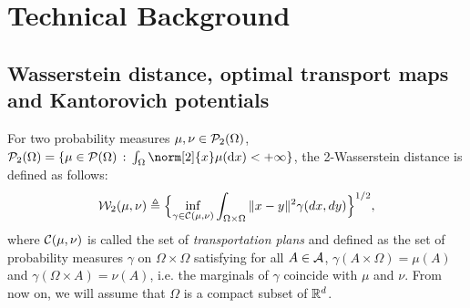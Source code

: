
\section{Technical Background}
\label{sec:techbg}




\vspace{-2pt}

\subsection{Wasserstein distance, optimal transport maps and Kantorovich potentials }
%
For two probability measures $\mu,\nu \in {\cal P}_2(\Omega)$, $\PS_2(\Omega) = \{ \mu \in \PS(\Omega) \, :\, \int_{\Omega} \norm[2]{x} \mu(\rmd x) < \plusinfty\}$, the 2-Wasserstein distance is defined as follows:
\begin{align}
{\cal W}_2(\mu,\nu) \triangleq \Bigl\{ \inf_{\gamma \in {\cal C}(\mu,\nu)} \int_{\Omega \times \Omega} \|x-y\|^2 \gamma(dx , dy) \Bigr\}^{1/2}, \label{eqn:w2}
\end{align}
where ${\cal C}(\mu,\nu)$ is called the set of \emph{transportation plans} and defined as the set of probability measures $\gamma$ on $\Omega \times \Omega$ satisfying for all $A \in {\cal A}$, $\gamma(A \times \Omega) = \mu(A)$ and $\gamma(\Omega \times A)=\nu(A)$, i.e. the  marginals of $\gamma$  coincide with $\mu$ and $\nu$. From now on, we will assume that $\Omega$ is a compact subset of $\mathbb{R}^d$.


